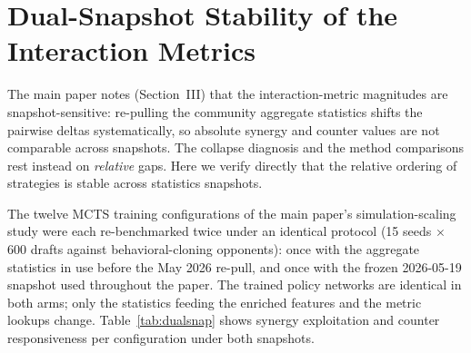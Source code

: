 \documentclass[journal]{IEEEtran}
\begin{document}
\section{Dual-Snapshot Stability of the Interaction Metrics}
\label{sec:dualsnap}

The main paper notes (Section~III) that the interaction-metric magnitudes are snapshot-sensitive: re-pulling the community aggregate statistics shifts the pairwise deltas systematically, so absolute synergy and counter values are not comparable across snapshots. The collapse diagnosis and the method comparisons rest instead on \textit{relative} gaps. Here we verify directly that the relative ordering of strategies is stable across statistics snapshots.

The twelve MCTS training configurations of the main paper's simulation-scaling study were each re-benchmarked twice under an identical protocol (15 seeds $\times$ 600 drafts against behavioral-cloning opponents): once with the aggregate statistics in use before the May 2026 re-pull, and once with the frozen 2026-05-19 snapshot used throughout the paper. The trained policy networks are identical in both arms; only the statistics feeding the enriched features and the metric lookups change. Table~\ref{tab:dualsnap} shows synergy exploitation and counter responsiveness per configuration under both snapshots.
\end{document}
